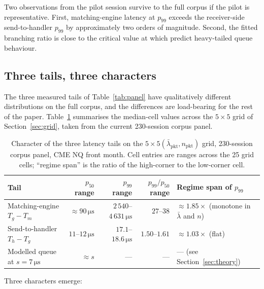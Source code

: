 \documentclass[11pt]{article}
\begin{document}
Two observations from the pilot session survive to the full corpus if the pilot is representative. First, matching-engine latency at $p_{99}$ exceeds the receiver-side send-to-handler $p_{99}$ by approximately two orders of magnitude. Second, the fitted branching ratio is close to the critical value at which \citet{dawpender2018queues} predict heavy-tailed queue behaviour.

\subsection{Three tails, three characters}
\label{sec:three-tails}

The three measured tails of Table~\ref{tab:panel} have qualitatively different distributions on the full corpus, and the differences are load-bearing for the rest of the paper. Table~\ref{tab:three-tails} summarises the median-cell values across the $5\times 5$ grid of Section~\ref{sec:grid}, taken from the current 230-session corpus panel.

\begin{table}[htbp]
\centering
\caption{Character of the three latency tails on the $5 \times 5 (\bar\lambda_{\mathrm{pkt}}, n_{\mathrm{pkt}})$ grid, 230-session corpus panel, CME NQ front month. Cell entries are ranges across the 25 grid cells; ``regime span'' is the ratio of the high-corner to the low-corner cell.}
\label{tab:three-tails}
\begin{tabularx}{\textwidth}{@{}l r r r X@{}}
\toprule
Tail & $p_{50}$ range & $p_{99}$ range & $p_{99}/p_{50}$ range & Regime span of $p_{99}$ \\
\midrule
Matching-engine $T_g - T_m$ & ${\approx}90\,\si{\micro\second}$ & $2\,540$--$4\,631\,\si{\micro\second}$ & $27$--$38$ & $\approx 1.85\times$ (monotone in $\bar\lambda$ and $n$) \\
Send-to-handler $T_h - T_g$ & $11$--$12\,\si{\micro\second}$ & $17.1$--$18.6\,\si{\micro\second}$ & $1.50$--$1.61$ & $\approx 1.03\times$ (flat) \\
Modelled queue at $s = 7\,\si{\micro\second}$ & $\approx s$ & --- & --- & --- (see Section~\ref{sec:theory}) \\
\bottomrule
\end{tabularx}
\end{table}

Three characters emerge:
\end{document}
